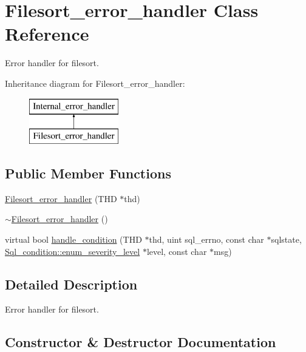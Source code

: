 \hypertarget{classFilesort__error__handler}{}\section{Filesort\+\_\+error\+\_\+handler Class Reference}
\label{classFilesort__error__handler}


Error handler for filesort.  


Inheritance diagram for Filesort\+\_\+error\+\_\+handler\+:\begin{figure}[H]
\begin{center}
\leavevmode
\includegraphics[height=2.000000cm]{classFilesort__error__handler}
\end{center}
\end{figure}
\subsection*{Public Member Functions}
\begin{DoxyCompactItemize}
\item 
\mbox{\hyperlink{classFilesort__error__handler_a95770e8f98036514774d2d40f4ae74f4}{Filesort\+\_\+error\+\_\+handler}} (T\+HD $\ast$thd)
\item 
\mbox{\hyperlink{classFilesort__error__handler_a86798c9eff65bce3d17fc72f5f618f68}{$\sim$\+Filesort\+\_\+error\+\_\+handler}} ()
\item 
virtual bool \mbox{\hyperlink{classFilesort__error__handler_a5cf5379334399f6459b90b48caf9c6fe}{handle\+\_\+condition}} (T\+HD $\ast$thd, uint sql\+\_\+errno, const char $\ast$sqlstate, \mbox{\hyperlink{classSql__condition_ab0602581e19cddb609bfe10c44be4e83}{Sql\+\_\+condition\+::enum\+\_\+severity\+\_\+level}} $\ast$level, const char $\ast$msg)
\end{DoxyCompactItemize}


\subsection{Detailed Description}
Error handler for filesort. 

\subsection{Constructor \& Destructor Documentation}
\mbox{\label{classFilesort__error__handler_a95770e8f98036514774d2d40f4ae74f4}} 
